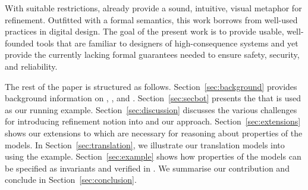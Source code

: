 With suitable restrictions, \Statecharts already provide a sound,
intuitive, visual metaphor for refinement. Outfitted with a formal
semantics, this work borrows from well-used \Statechart practices in
digital design.  The goal of the present work is to provide usable,
well-founded tools that are familiar to designers of high-consequence
systems and yet provide the currently lacking formal guarantees needed
to ensure safety, security, and reliability.

The rest of the paper is structured as follows.  Section~\ref{sec:background} provides background information on \SCXML, \EventB, and \iUMLB.  Section~\ref{sec:secbot} presents the \IDS that is used as our running example.  Section~\ref{sec:discussion} discusses the various challenges for introducing refinement notion into \SCXML and our approach.  Section~\ref{sec:extensions} shows our extensions to \SCXML which are necessary for reasoning about properties of the \SCXML models.  In Section~\ref{sec:translation}, we illustrate our translation \SCXML models into \EventB using the \IDS example.  Section~\ref{sec:example} shows how properties of the \SCXML models can be specified as invariants and verified in \EventB.  We summarise our contribution and conclude in Section~\ref{sec:conclusion}.

